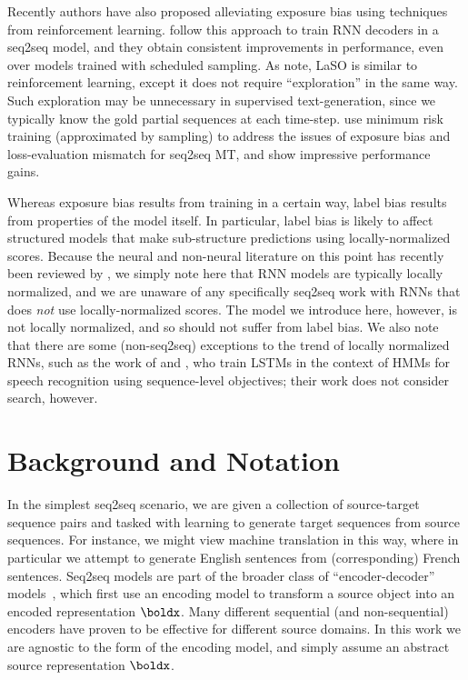 \documentclass[11pt,letterpaper]{article}
\begin{document}
Recently authors have also proposed alleviating exposure bias using
techniques from reinforcement learning. 
 follow this approach to train RNN decoders
in a seq2seq model, and they obtain consistent improvements in performance, even over models trained with scheduled sampling. As  note, LaSO is similar to reinforcement learning, except
it does not require ``exploration'' in the same
way. Such exploration may be unnecessary in supervised text-generation, since we typically know the
gold partial sequences at each time-step.  use minimum risk training (approximated by sampling) to address the issues of exposure bias and loss-evaluation mismatch for seq2seq MT, and show impressive performance gains.

Whereas exposure bias results from training in a certain way, label
bias results from properties of the model itself. In particular, label
bias is likely to affect structured models that make sub-structure
predictions using locally-normalized scores. Because the neural and
non-neural literature on this point has recently been reviewed by
, we simply note here that RNN
models are typically locally normalized, and we are unaware of any
specifically seq2seq work with RNNs that does \textit{not} use
locally-normalized scores. The model we introduce here, however, is
not locally normalized, and so should not suffer from label bias. We
also note that there are some (non-seq2seq) exceptions to the trend of
locally normalized RNNs, such as the work of 
and , who train LSTMs in the context
of HMMs for speech recognition using sequence-level objectives; their
work does not consider search, however.

%
 
\section{Background and Notation}
\label{sec:background}
In the simplest seq2seq scenario, we are given a collection of source-target
sequence pairs and tasked with learning to generate
target sequences from source sequences. For instance, we might view machine translation in this way, where in particular we attempt to generate English sentences from (corresponding) French sentences. Seq2seq models are part of the broader class of ``encoder-decoder'' models~\cite{cho14on}, which first use an encoding model to transform a source object into an encoded representation $\boldx$. Many different sequential
(and non-sequential) encoders have proven to be effective for
different source domains. In this work we are agnostic to the
form of the encoding model, and simply assume an abstract source
representation $\boldx$. 
\end{document}
